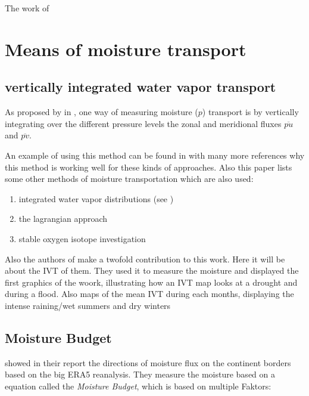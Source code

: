 The work of \citeauthor{precipitation_seasonality}

\section{Means of moisture transport}

\subsection{vertically integrated water vapor transport}

As proposed by \citeauthor{AProposedAlgorithmforMoistureFluxesfromAtmosphericRivers} in \cite{AProposedAlgorithmforMoistureFluxesfromAtmosphericRivers}, one way of measuring moisture ($p$) transport is by vertically integrating over the different pressure levels the zonal and meridional fluxes $\overline{pu}$ and $\overline{pv}$. 

An example of using this method can be found in \cite{Ayantobo2021IntegratedMT} with many more references why this method is working well for these kinds of approaches. 
Also this paper lists some other methods of moisture transportation which are also used:

\begin{enumerate}
  \item integrated water vapor distributions (see \cite{gimeno2014atmospheric_rivers_review})
  \item the lagrangian approach
  \item stable oxygen isotope investigation
\end{enumerate}

Also the authors of \cite{Ayantobo2021IntegratedMT} make a twofold contribution to this work. 
Here it will be about the IVT of them. 
They used it to measure the moisture and displayed the first graphics of the woork, illustrating how an IVT map looks at a drought and during a flood.
Also maps of the mean IVT during each months, displaying the intense raining/wet summers and dry winters

\subsection{Moisture Budget}

\citeauthor{atmos13101694} showed in their report \cite{atmos13101694} the directions of moisture flux on the continent borders based on the big ERA5 reanalysis.
They measure the moisture based on a equation called the \textit{Moisture Budget}, which is based on multiple Faktors: 

